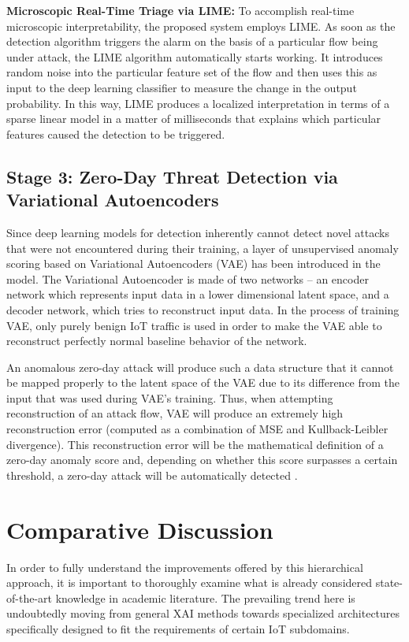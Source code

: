 \documentclass[12pt]{article}
\begin{document}
    \textbf{Microscopic Real-Time Triage via LIME:} To accomplish real-time microscopic interpretability, the proposed system employs LIME. As soon as the detection algorithm triggers the alarm on the basis of a particular flow being under attack, the LIME algorithm automatically starts working. It introduces random noise into the particular feature set of the flow and then uses this as input to the deep learning classifier to measure the change in the output probability. In this way, LIME produces a localized interpretation in terms of a sparse linear model in a matter of milliseconds that explains which particular features caused the detection to be triggered.

    \subsection{Stage 3: Zero-Day Threat Detection via Variational Autoencoders}
    Since deep learning models for detection inherently cannot detect novel attacks that were not encountered during their training, a layer of unsupervised anomaly scoring based on Variational Autoencoders (VAE) has been introduced in the model. The Variational Autoencoder is made of two networks – an encoder network which represents input data in a lower dimensional latent space, and a decoder network, which tries to reconstruct input data. In the process of training VAE, only purely benign IoT traffic is used in order to make the VAE able to reconstruct perfectly normal baseline behavior of the network.
    
    An anomalous zero-day attack will produce such a data structure that it cannot be mapped properly to the latent space of the VAE due to its difference from the input that was used during VAE’s training. Thus, when attempting reconstruction of an attack flow, VAE will produce an extremely high reconstruction error (computed as a combination of MSE and Kullback-Leibler divergence). This reconstruction error will be the mathematical definition of a zero-day anomaly score and, depending on whether this score surpasses a certain threshold, a zero-day attack will be automatically detected \cite{zolanvari2021transparent, aspg2025zeroday}.

    \section{Comparative Discussion}
    In order to fully understand the improvements offered by this hierarchical approach, it is important to thoroughly examine what is already considered state-of-the-art knowledge in academic literature. The prevailing trend here is undoubtedly moving from general XAI methods towards specialized architectures specifically designed to fit the requirements of certain IoT subdomains.
\end{document}
